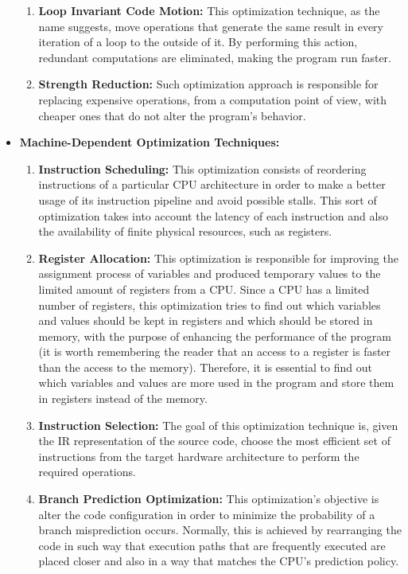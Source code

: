 \begin{itemize}
\begin{enumerate}
            \item \textbf{Loop Invariant Code Motion:} This optimization technique, as the name suggests, move operations that generate the same result in every iteration of a loop to the outside of it. By performing this action, redundant computations are eliminated, making the program run faster.
            
            \item \textbf{Strength Reduction:} Such optimization approach is responsible for replacing expensive operations, from a computation point of view, with cheaper ones that do not alter the program's behavior.
        \end{enumerate}
    \item \textbf{Machine-Dependent Optimization Techniques:}
        \begin{enumerate}
            \item \textbf{Instruction Scheduling:} This optimization consists of reordering instructions of a particular CPU architecture in order to make a better usage of its instruction pipeline and avoid possible stalls. This sort of optimization takes into account the latency of each instruction and also the availability of finite physical resources, such as registers.
            
            \item \textbf{Register Allocation:} This optimization is responsible for improving the assignment process of variables and produced temporary values to the limited amount of registers from a CPU. Since a CPU has a limited number of registers, this optimization tries to find out which variables and values should be kept in registers and which should be stored in memory, with the purpose of enhancing the performance of the program (it is worth remembering the reader that an access to a register is faster than the access to the memory). Therefore, it is essential to find out which variables and values are more used in the program and store them in registers instead of the memory.
            
            \item \textbf{Instruction Selection:} The goal of this optimization technique is, given the IR representation of the source code, choose the most efficient set of instructions from the target hardware architecture to perform the required operations.
            
            \item \textbf{Branch Prediction Optimization:} This optimization's objective is alter the code configuration in order to minimize the probability of a branch misprediction occurs. Normally, this is achieved by rearranging the code in such way that execution paths that are frequently executed are placed closer and also in a way that matches the CPU's prediction policy.
            

\end{enumerate}
\end{itemize}
